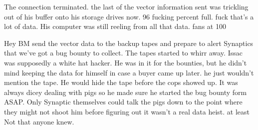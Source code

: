 \documentclass[a4paper,twoside,fontsize=12pt,pagesize=auto]{scrbook}
\begin{document}
The connection terminated. the last of the vector information sent was trickling out of his buffer onto his storage drives now. 96 fucking percent full. fuck that's a lot of data. His computer was still reeling from all that data. fans at 100%

Hey BM send the vector data to the backup tapes and prepare to alert Synaptics that we've got a bug bounty to collect. The tapes started to whirr away. Issac was supposedly a white hat hacker. He was in it for the bounties, but he didn't mind keeping the data for himself in case a buyer came up later. he just wouldn't mention the tape. He would hide the tape before the cops showed up. It was always dicey dealing with pigs so he made sure he started the bug bounty form ASAP. Only Synaptic themselves could talk the pigs down to the point where they might not shoot him before figuring out it wasn't a real data heist. at least Not that anyone knew.
\end{document}
